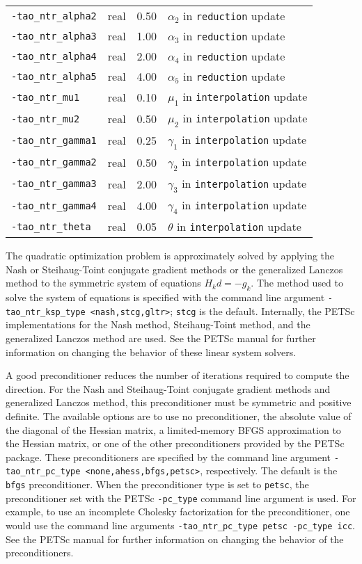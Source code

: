 \begin{table}[h]
\begin{tabular}{l|p{1.5in}|l|p{2.0in}}
{\tt -tao\_ntr\_alpha2} & real & 0.50 & $\alpha_2$ in {\tt reduction} update \\
{\tt -tao\_ntr\_alpha3} & real & 1.00 & $\alpha_3$ in {\tt reduction} update \\
{\tt -tao\_ntr\_alpha4} & real & 2.00 & $\alpha_4$ in {\tt reduction} update \\
{\tt -tao\_ntr\_alpha5} & real & 4.00 & $\alpha_5$ in {\tt reduction} update \\
{\tt -tao\_ntr\_mu1} & real & 0.10 & $\mu_1$ in {\tt interpolation} update \\
{\tt -tao\_ntr\_mu2} & real & 0.50 & $\mu_2$ in {\tt interpolation} update \\
{\tt -tao\_ntr\_gamma1} & real & 0.25 & $\gamma_1$ in {\tt interpolation} update \\
{\tt -tao\_ntr\_gamma2} & real & 0.50 & $\gamma_2$ in {\tt interpolation} update \\
{\tt -tao\_ntr\_gamma3} & real & 2.00 & $\gamma_3$ in {\tt interpolation} update \\
{\tt -tao\_ntr\_gamma4} & real & 4.00 & $\gamma_4$ in {\tt interpolation} update \\
{\tt -tao\_ntr\_theta} & real & 0.05 & $\theta$ in {\tt interpolation} update \\
\hline
\end{tabular}
\end{table}
\afterpage{\clearpage}

The quadratic optimization problem is approximately solved by applying
the Nash or Steihaug-Toint conjugate gradient methods or the 
generalized Lanczos 
method to the symmetric system of equations $H_k d = -g_k$.  The method 
used to solve the system of equations is specified with the command line
argument {\tt -tao\_ntr\_ksp\_type <nash,stcg,gltr>}; {\tt stcg} is the default.  
Internally, the PETSc implementations for the Nash method, Steihaug-Toint 
method, and the generalized Lanczos method are used.  See the PETSc manual 
for further information on changing the behavior of these linear system 
solvers.  

A good preconditioner reduces the number of iterations required to
compute the direction.  For the Nash and Steihaug-Toint conjugate gradient
methods and generalized Lanczos method, this preconditioner must be
symmetric and positive definite.  The available options are to use no
preconditioner, the absolute value of the diagonal of the Hessian
matrix, a limited-memory BFGS approximation to the Hessian matrix, or
one of the other preconditioners provided by the PETSc package.  These
preconditioners are specified by the command line argument 
{\tt -tao\_ntr\_pc\_type <none,ahess,bfgs,petsc>}, respectively.  The
default is the {\tt bfgs} preconditioner.  When the preconditioner
type is set to {\tt petsc}, the preconditioner set with the PETSc
{\tt -pc\_type} command line argument is used.  For example, to use an
incomplete Cholesky factorization for the preconditioner, one would
use the command line arguments 
{\tt -tao\_ntr\_pc\_type petsc -pc\_type icc}.  See the PETSc manual 
for further information on changing the behavior of the preconditioners.

